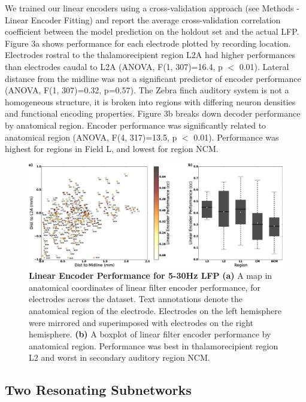     We trained our linear encoders using a cross-validation approach (see Methods - Linear Encoder Fitting) and report the average cross-validation correlation coefficient between the model prediction on the holdout set and the actual LFP. Figure 3a shows performance for each electrode plotted by recording location. Electrodes rostral to the thalamorecipient region L2A had higher performances than electrodes caudal to L2A (ANOVA, F(1, 307)=16.4, p $<$ 0.01). Lateral distance from the midline was not a significant predictor of encoder performance (ANOVA, F(1, 307)=0.32, p=0.57). The Zebra finch auditory system is not a homogeneous structure, it is broken into regions with differing neuron densities and functional encoding properties. Figure 3b breaks down decoder performance by anatomical region. Encoder performance was significantly related to anatomical region (ANOVA, F(4, 317)=13.5, p $<$ 0.01). Performance was highest for regions in Field L, and lowest for region NCM.

\begin{figure}
    \caption{\textbf{Linear Encoder Performance for 5-30Hz LFP} \textbf{(a)} A map in anatomical coordinates of linear filter encoder performance, for electrodes across the dataset. Text annotations denote the anatomical region of the electrode. Electrodes on the left hemisphere were mirrored and superimposed with electrodes on the right hemisphere. \textbf{(b)} A boxplot of linear filter encoder performance by anatomical region. Performance was best in thalamorecipient region L2 and worst in secondary auditory region NCM.
}
    \centering
    \includegraphics[scale=0.25]{figure_2_3.eps}
\end{figure}

\subsection{Two Resonating Subnetworks}

